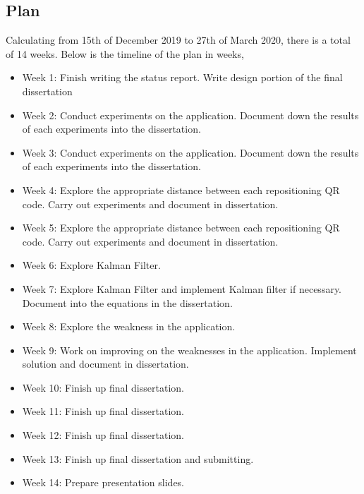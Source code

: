 \documentclass[11pt]{article}
\begin{document}
\subsection{Plan}\label{plan}

Calculating from 15th of December 2019 to 27th of March 2020, there is a total of 14 weeks. Below is the timeline of the plan in weeks,

\begin{itemize}
  \item Week 1: Finish writing the status report. Write design portion of the final dissertation
  \item Week 2: Conduct experiments on the application. Document down the results of each experiments into the dissertation.
  \item Week 3: Conduct experiments on the application. Document down the results of each experiments into the dissertation.
  \item Week 4: Explore the appropriate distance between each repositioning QR code. Carry out experiments and document in dissertation.
  \item Week 5: Explore the appropriate distance between each repositioning QR code. Carry out experiments and document in dissertation.
  \item Week 6: Explore Kalman Filter.
  \item Week 7: Explore Kalman Filter and implement Kalman filter if necessary. Document into the equations in the dissertation.
  \item Week 8: Explore the weakness in the application.
  \item Week 9: Work on improving on the weaknesses in the application. Implement solution and document in dissertation.
  \item Week 10: Finish up final dissertation.
  \item Week 11: Finish up final dissertation.
  \item Week 12: Finish up final dissertation.
  \item Week 13: Finish up final dissertation and submitting.
  \item Week 14: Prepare presentation slides.
\end{itemize}




    
    
    
\end{document}
